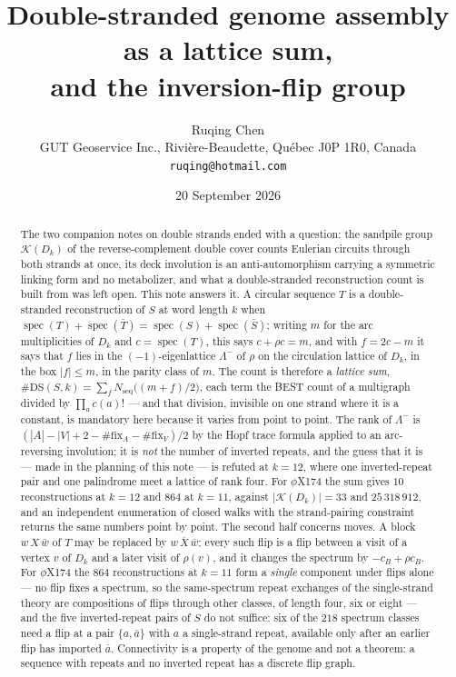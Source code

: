 \documentclass[11pt]{article}
\title{\bfseries Double-stranded genome assembly as a lattice sum,\\
and the inversion-flip group}
\author{Ruqing Chen\\[2pt]
\normalsize GUT Geoservice Inc., Rivi\`ere-Beaudette, Qu\'ebec J0P 1R0, Canada\\
\normalsize\texttt{ruqing@hotmail.com}}
\date{20 September 2026}
\theoremstyle{plain}
\theoremstyle{definition}
\theoremstyle{remark}
\newcommand{\K}{\mathcal{K}}
\newcommand{\spec}{\operatorname{spec}}
\newcommand{\Nseq}{N_{\mathrm{seq}}}
\newcommand{\DS}{\mathrm{DS}}
\newcommand{\Lm}{\Lambda^{-}}
\begin{document}
\maketitle

\begin{abstract}
\noindent
The two companion notes on double strands ended with a question: the sandpile group
$\K(D_k)$ of the reverse-complement double cover counts Eulerian circuits through both
strands at once, its deck involution is an anti-automorphism carrying a symmetric linking
form and no metabolizer, and what a double-stranded reconstruction count is built from was
left open. This note answers it. A circular sequence $T$ is a double-stranded reconstruction
of $S$ at word length $k$ when $\spec(T)+\spec(\bar T)=\spec(S)+\spec(\bar S)$; writing $m$
for the arc multiplicities of $D_k$ and $c=\spec(T)$, this says $c+\rho c=m$, and with
$f=2c-m$ it says that $f$ lies in the $(-1)$-eigenlattice $\Lm$ of $\rho$ on the circulation
lattice of $D_k$, in the box $|f|\le m$, in the parity class of $m$. The count is therefore a
\emph{lattice sum}, $\#\DS(S,k)=\sum_f \Nseq\big((m+f)/2\big)$, each term the BEST count of a
multigraph divided by $\prod_a c(a)!$ --- and that division, invisible on one strand where it
is a constant, is mandatory here because it varies from point to point. The rank of $\Lm$ is
$(|A|-|V|+2-\#\mathrm{fix}_A-\#\mathrm{fix}_V)/2$ by the Hopf trace formula applied to an
arc-reversing involution; it is \emph{not} the number of inverted repeats, and the guess that
it is --- made in the planning of this note --- is refuted at $k=12$, where one inverted-repeat
pair and one palindrome meet a lattice of rank four. For $\phi$X174 the sum gives $10$
reconstructions at $k=12$ and $864$ at $k=11$, against $|\K(D_k)|=33$ and $25\,318\,912$, and
an independent enumeration of closed walks with the strand-pairing constraint returns the
same numbers point by point. The second half concerns moves. A block $w\,X\,\bar w$ of $T$ may
be replaced by $w\,\overline{X}\,\bar w$; every such flip is a flip between a visit of a
vertex $v$ of $D_k$ and a later visit of $\rho(v)$, and it changes the spectrum by
$-c_B+\rho c_B$. For $\phi$X174 the $864$ reconstructions at $k=11$ form a \emph{single}
component under flips alone --- no flip fixes a spectrum, so the same-spectrum repeat
exchanges of the single-strand theory are compositions of flips through other classes, of
length four, six or eight --- and the five inverted-repeat pairs of $S$ do not suffice: six of
the $218$ spectrum classes need a flip at a pair $\{a,\bar a\}$ with $a$ a single-strand
repeat, available only after an earlier flip has imported $\bar a$. Connectivity is a property
of the genome and not a theorem: a sequence with repeats and no inverted repeat has a discrete
flip graph.
\end{abstract}
\end{document}
